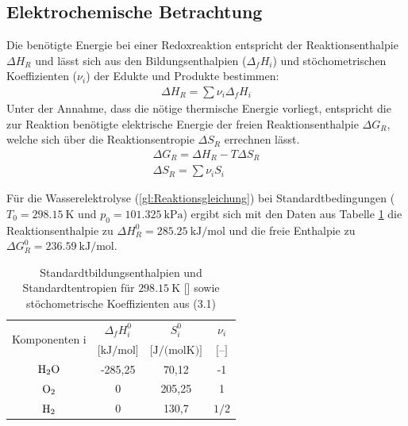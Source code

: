 \subsection{Elektrochemische Betrachtung}
\label{subsec:Energetische Betrachtung}
Die benötigte Energie bei einer Redoxreaktion entspricht der Reaktionsenthalpie $\Delta H_R$ und lässt sich aus den Bildungsenthalpien ($\Delta_f H_i$) und stöchometrischen Koeffizienten ($\nu_i$) der Edukte und Produkte bestimmen:
\begin{align}
 	\Delta H_R = \sum{\nu_i \Delta_f H_i}
\end{align}
Unter der Annahme, dass die nötige thermische Energie vorliegt, entspricht die zur Reaktion benötigte elektrische Energie  der freien Reaktionsenthalpie $\Delta G_R$, welche sich über die Reaktionsentropie $\Delta S_R$ errechnen lässt.
\begin{align}
	\Delta G_R = \Delta H_R - T\Delta S_R \\
 	\Delta S_R = \sum{\nu_i S_i}
\end{align}

Für die Wasserelektrolyse (\ref{gl:Reaktionsgleichung}) bei Standardtbedingungen ($T_0 = \SI{298,15}{\kelvin}$ und $p_0 = \SI{101,325}{\kilo\pascal}$) ergibt sich mit den Daten aus Tabelle \ref{tb:Stoffdaten} die Reaktionsenthalpie zu $\Delta H^0_R = \SI{285,25}{\kilo\J\per\mol}$ und die freie Enthalpie zu $\Delta G^0_R = \SI{236,59}{\kilo\J\per\mol}$. 
\begin{table}[ht]
		\centering
		\caption{Standardtbildungsenthalpien und Standardtentropien für $\SI{298,15}{\kelvin}$ [\cite{?%
		}] sowie stöchometrische Koeffizienten aus (3.1)}
		\begin{tabular}{c c c c}
		\toprule
		\multirow{2}{*}{Komponenten i} & 
		\multicolumn{1}{c}{$\Delta_f H^0_i$} & 
		\multicolumn{1}{c}{$S^0_i$} &
		\multicolumn{1}{c}{$\nu_i$}
		\\
		& 
		\multicolumn{1}{c}{$\textrm{[kJ/mol]}$}& 
		\multicolumn{1}{c}{$\textrm{[J/(molK)]}$} &
		\multicolumn{1}{c}{$\textrm{[--]}$}
		\\
		\midrule
		$\ce{H2O}$ & -285,25 & 70,12 & -1\\
		$\ce{O2}$ & 0 & 205,25 & 1\\
		$\ce{H2}$ & 0 & 130,7 & $\textrm{1/2}$\\
		\bottomrule
		\end{tabular}
		\label{tb:Stoffdaten}
		\end{table}	
			
